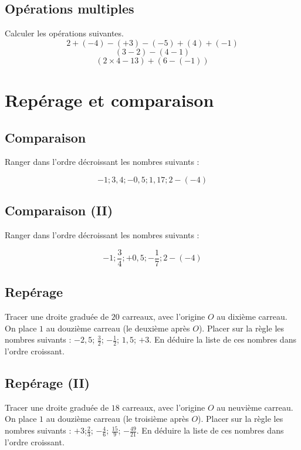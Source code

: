 \documentclass[12 pt]{article}
\theoremstyle{plain}
\newcounter{n}
\numberwithin{n}{section}
\begin{document}
\subsection{Opérations multiples}

Calculer les opérations suivantes. 
\[ 2 + (-4) - (+3) - (-5) + (4) + (-1) \]
\[ (3 - 2) - (4 - 1) \] 
\[ (2\times 4 - 13) + (6 - (-1) ) \]

%


%
\section{Repérage et comparaison}
\subsection{Comparaison}

Ranger dans l'ordre décroissant les nombres suivants : 

\[ -1 ; 3,4 ; -0,5 ; 1,17 ; 2 - (-4)\]

\subsection{Comparaison (II)}

Ranger dans l'ordre décroissant les nombres suivants : 

\[ -1 ; \frac34 ; +0,5 ; -\frac17 ; 2 - (-4)\]
\subsection{Repérage}

Tracer une droite graduée de $20$ carreaux, avec l'origine $O$ au dixième carreau. On place $1$ au douzième carreau (le deuxième après $O$). Placer sur la règle les nombres suivants : $ -2,5$; $\frac32$; $-\frac12$; $1,5$; $+3$. 
En déduire la liste de ces nombres dans l'ordre croissant. 


\subsection{Repérage (II)}

Tracer une droite graduée de $18$ carreaux, avec l'origine $O$ au neuvième carreau. On place $1$ au douzième carreau (le troisième après $O$). Placer sur la règle les nombres suivants : $+ 3$;$\frac23$; $-\frac46$; $\frac{15}{9} $; $-\frac{49}{21}$. 
En déduire la liste de ces nombres dans l'ordre croissant. 
\end{document}
